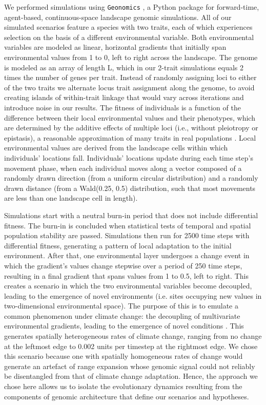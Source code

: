 \documentclass[9pt,twocolumn,twoside,lineno]{new_article}
\begin{document}
We performed simulations using \texttt{Geonomics} \cite{terasaki_hart},
a Python \cite{rossum} package for forward-time, agent-based, continuous-space landscape genomic simulations.
All of our simulated scenarios feature
a species with two traits, each of which experiences 
selection on the basis of a different environmental variable.
Both environmental variables are modeled as linear, horizontal gradients
that initially span environmental values from 1 to 0, left to right across the landscape.
The genome is modeled as an array of length L,
which in our 2-trait simulations equals 2 times the number of genes per trait.
Instead of randomly assigning loci to either of the two traits
we alternate locus trait assignment along the genome,
to avoid creating islands of within-trait linkage
that would vary across iterations and introduce noise in our results.
The fitness of individuals is a function of the difference between their local
environmental values and their phenotypes, which are determined by the
additive effects of multiple loci (i.e., without pleiotropy or epistasis), a reasonable approximation of many traits in real populations \cite{sella}.
Local environmental values are derived from the landscape cells within which individuals' locations fall.
Individuals' locations update during each time step's movement phase,
when each individual moves along a vector composed of a randomly drawn direction
(from a uniform circular distribution) and a randomly drawn distance
(from a Wald(0.25, 0.5) distribution, such that most movements are less than one landscape cell in length).

Simulations start with a neutral burn-in period that does not include differential fitness.
The burn-in is concluded when statistical tests
of temporal and spatial population stability are passed.
Simulations then run for 2500 time steps with differential fitness,
generating a pattern of local adaptation to the initial environment.
After that, one environmental layer undergoes a change 
event in which the gradient’s values change stepwise over a period of 250 time steps,
resulting in a final gradient that spans values from 1 to 0.5, left to right.
This creates a scenario in 
which the two environmental variables become decoupled, leading 
to the emergence of novel environments (i.e. sites occupying new values in 
two-dimensional environmental space).
The purpose of this is to emulate a common 
phenomenon under climate change: the decoupling of multivariate environmental gradients,
leading to the emergence of novel conditions
\cite{williams_novel_climates,williams_projected_novel_disappearing,fitzpatrick}.
This generates spatially heterogeneous rates of climate change, ranging from no change at the leftmost edge to 0.002 units per timestep at the rightmost edge.
We chose this scenario because one with spatially homogeneous rates of change would generate an artefact of range expansion
whose genomic signal could not reliably be disentangled from that of
climate change adaptation. Hence, the approach we chose here allows us
to isolate the evolutionary dynamics
resulting from the components of genomic architecture
that define our scenarios and hypotheses.
\end{document}
